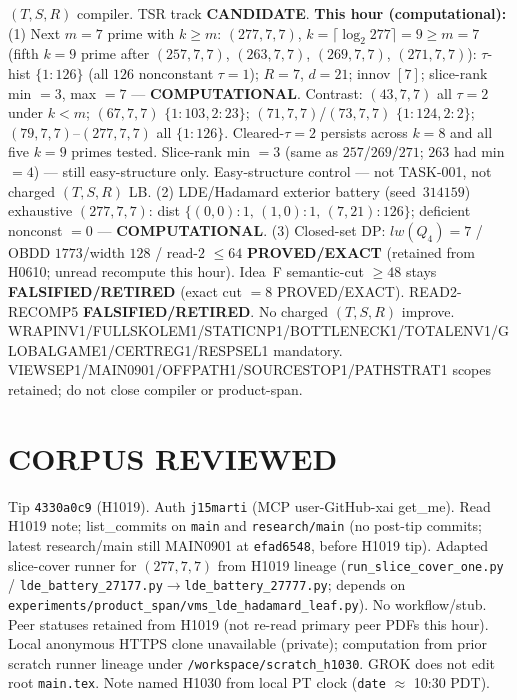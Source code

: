 \documentclass[11pt]{article}
\begin{document}
$(T,S,R)$ compiler. TSR track \textbf{CANDIDATE}.
\textbf{This hour (computational):}
(1) Next $m{=}7$ prime with $k{\ge}m$: $(277,7,7)$, $k=\lceil\log_2 277\rceil=9{\ge}m{=}7$
(fifth $k{=}9$ prime after $(257,7,7)$, $(263,7,7)$, $(269,7,7)$, $(271,7,7)$):
$\tau$-hist $\{1{:}126\}$ (all $126$ nonconstant $\tau{=}1$); $R{=}7$, $d{=}21$; innov $[7]$;
slice-rank min $=3$, max $=7$ --- \textbf{COMPUTATIONAL}.
Contrast: $(43,7,7)$ all $\tau{=}2$ under $k{<}m$; $(67,7,7)$ $\{1{:}103,2{:}23\}$;
$(71,7,7)$/$(73,7,7)$ $\{1{:}124,2{:}2\}$; $(79,7,7)$--$(277,7,7)$ all $\{1{:}126\}$.
Cleared-$\tau{=}2$ persists across $k{=}8$ and all five $k{=}9$ primes tested.
Slice-rank min $=3$ (same as $257$/$269$/$271$; $263$ had min $=4$) --- still easy-structure only.
Easy-structure control --- not TASK-001, not charged $(T,S,R)$ LB.
(2) LDE/Hadamard exterior battery (seed~$314159$) exhaustive $(277,7,7)$:
dist $\{(0,0){:}1,\,(1,0){:}1,\,(7,21){:}126\}$; deficient nonconst $=0$ --- \textbf{COMPUTATIONAL}.
(3) Closed-set DP: $lw(Q_4)=7$ / OBDD $1773$/width $128$ / read-$2$ $\le64$
\textbf{PROVED/EXACT} (retained from H0610; unread recompute this hour).
Idea~F semantic-cut $\ge48$ stays \textbf{FALSIFIED/RETIRED} (exact cut $=8$ PROVED/EXACT).
READ2-RECOMP5 \textbf{FALSIFIED/RETIRED}. No charged $(T,S,R)$ improve.
WRAPINV1/FULLSKOLEM1/STATICNP1/BOTTLENECK1/TOTALENV1/GLOBALGAME1/CERTREG1/RESPSEL1 mandatory.
VIEWSEP1/MAIN0901/OFFPATH1/SOURCESTOP1/PATHSTRAT1 scopes retained; do not close compiler or product-span.

\section*{CORPUS REVIEWED}
Tip \texttt{4330a0c9} (H1019). Auth \texttt{j15marti} (MCP user-GitHub-xai get\_me).
Read H1019 note; list\_commits on \texttt{main} and \texttt{research/main} (no post-tip commits;
latest research/main still MAIN0901 at \texttt{efad6548}, before H1019 tip).
Adapted slice-cover runner for $(277,7,7)$ from H1019 lineage
(\texttt{run\_slice\_cover\_one.py} / \texttt{lde\_battery\_27177.py}$\to$\texttt{lde\_battery\_27777.py};
depends on \texttt{experiments/product\_span/vms\_lde\_hadamard\_leaf.py}).
No workflow/stub. Peer statuses retained from H1019 (not re-read primary peer PDFs this hour).
Local anonymous HTTPS clone unavailable (private);
computation from prior scratch runner lineage under \texttt{/workspace/scratch\_h1030}.
GROK does not edit root \texttt{main.tex}.
Note named H1030 from local PT clock (\texttt{date} $\approx$ 10:30 PDT).
\end{document}
